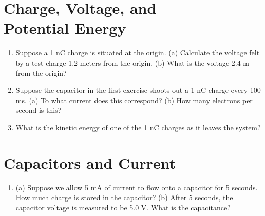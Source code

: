 \documentclass{article}
\begin{document}
\section{Charge, Voltage, and \\ Potential Energy}

\begin{enumerate}
\item Suppose a 1 nC charge is situated at the origin.  (a) Calculate the voltage felt by a test charge 1.2 meters from the origin. (b) What is the voltage 2.4 m from the origin? \\ \vspace{2cm}
\item Suppose the capacitor in the first exercise shoots out a 1 nC charge every 100 ms.  (a) To what current does this correspond? (b) How many electrons per second is this? \\ \vspace{2cm}
\item What is the kinetic energy of one of the 1 nC charges as it leaves the system? \\ \vspace{2cm}
\end{enumerate}

\section{Capacitors and Current}

\begin{enumerate}
\item (a) Suppose we allow 5 mA of current to flow onto a capacitor for 5 seconds.  How much charge is stored in the capacitor? (b) After 5 seconds, the capacitor voltage is measured to be 5.0 V.  What is the capacitance? \\ \vspace{3cm}
\end{enumerate}
\end{document}
